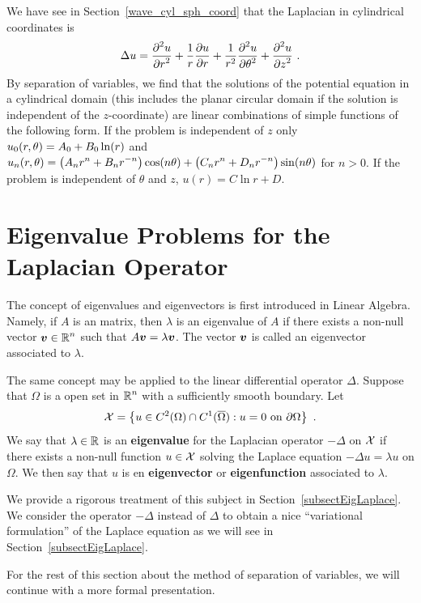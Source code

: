 We have see in Section~\ref{wave_cyl_sph_coord} that the Laplacian in
cylindrical coordinates is
\[
\Delta u = \frac{\displaystyle \partial^{2}{u}} {\displaystyle \partial r^{2}} + \frac{1}{r} \frac{\partial{u}}{\partial r}
+ \frac{1}{r^2} \frac{\displaystyle \partial^{2}{u}} {\displaystyle \partial \theta^{2}} + \frac{\displaystyle \partial^{2}{u}} {\displaystyle \partial z^{2}} \ .
\]
By separation of variables, we find that the solutions of the
potential equation in a cylindrical domain (this includes the planar
circular domain if the solution is independent of the $z$-coordinate)
are linear combinations of simple functions of the following form.
If the problem is independent of $z$ only
$\displaystyle u_0(r,\theta) = A_0 + B_0 \ln(r)$
and
$\displaystyle u_n(r,\theta)
= \left(A_n r^n + B_n r^{-n}\right) \cos(n \theta)
+ \left(C_n r^n + D_n r^{-n}\right) \sin(n \theta)$
for $n > 0$.  If the problem is independent of $\theta$ and $z$,
$u(r) = C \ln r + D$.

\section{Eigenvalue Problems for the Laplacian Operator}
\label{sectEigLaplace}

The concept of eigenvalues and eigenvectors is first introduced in
Linear Algebra.  Namely, if $A$ is an \nn matrix, then 
$\lambda$ is an eigenvalue of $A$ if there exists a non-null vector
$\displaystyle {\bm{v}}\in \mathbb{R}^n$ such that $A{\bm{v}} = \lambda {\bm{v}}$.
The vector ${\bm{v}}$ is called an eigenvector associated to $\lambda$.

The same concept may be applied to the linear differential operator
$\Delta$.  Suppose that $\Omega$ is a open set in $\displaystyle \mathbb{R}^n$ with a
sufficiently smooth boundary.  Let
\[
  {\cal X} = \left\{ u \in C^2(\Omega) \cap C^1(\overline{\Omega}) :
    u = 0 \ \text{on} \ \partial \Omega\right\} \ .
\]
We say that $\lambda \in \mathbb{R}$ is an
{\bfseries eigenvalue} for the Laplacian 
operator $-\Delta$ on $\cal X$ if there exists a non-null function
$u \in \cal X$ solving the Laplace equation
$-\Delta u = \lambda u$ on $\Omega$.
We then say that $u$ is en
{\bfseries eigenvector} or
{\bfseries eigenfunction} associated to
$\lambda$.

We provide a rigorous treatment of this subject in
Section~\ref{subsectEigLaplace}.  We consider the operator $-\Delta$
instead of $\Delta$ to obtain a nice ``variational formulation'' of
the Laplace equation as we will see in Section~\ref{subsectEigLaplace}.

For the rest of this section about the method of
separation of variables, we will continue with a more formal presentation.

